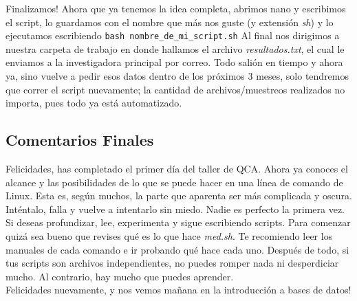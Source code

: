 \documentclass[10pt,letterpaper]{article}
\newcommand{\inlinecode}[1]{
\colorbox{light-gray}{\texttt{#1}}
}
\begin{document}
Finalizamos! Ahora que ya tenemos la idea completa, abrimos nano y escribimos el script, lo guardamos con el nombre que m\'as nos guste (y extensi\'on \emph{sh}) y lo ejecutamos escribiendo \inlinecode{bash nombre\_de\_mi\_script.sh} Al final nos dirigimos a nuestra carpeta de trabajo en donde hallamos el archivo \emph{resultados.txt}, el cual le enviamos a la investigadora principal por correo. Todo sali\'on en tiempo y ahora ya, sino vuelve a pedir esos datos dentro de los pr\'oximos 3 meses, solo tendremos que correr el script nuevamente; la cantidad de archivos/muestreos realizados no importa, pues todo ya est\'a automatizado.

\subsection{Comentarios Finales}
Felicidades, has completado el primer d\'ia del taller de QCA. Ahora ya conoces el alcance y las posibilidades de lo que se puede hacer en una l\'inea de comando de Linux. Esta es, seg\'un muchos, la parte que aparenta ser m\'as complicada y oscura. Int\'entalo, falla y vuelve a intentarlo sin miedo. Nadie es perfecto la primera vez.\\

Si deseas profundizar, lee, experimenta y sigue escribiendo scripts. Para comenzar quiz\'a sea bueno que revises qu\'e es lo que hace \emph{med.sh}. Te recomiendo leer los manuales de cada comando e ir probando qu\'e hace cada uno. Despu\'es de todo, si tus scripts son archivos independientes, no puedes romper nada ni desperdiciar mucho. Al contrario, hay mucho que puedes aprender.\\

Felicidades nuevamente, y nos vemos ma\~nana en la introducci\'on a bases de datos!
\end{document}
